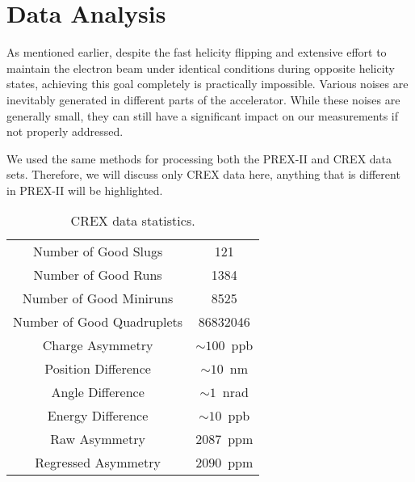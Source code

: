 \chapter{Data Analysis}
\label{cha:data_analysis}
As mentioned earlier, despite the fast helicity flipping and extensive effort to maintain
the electron beam under identical conditions during opposite helicity states, 
achieving this goal completely is practically impossible. Various noises are 
inevitably generated in different parts of the accelerator. While these noises
are generally small, they can still have a significant impact on our measurements
if not properly addressed.

We used the same methods for processing both the PREX-II and CREX data sets. 
Therefore, we will discuss only CREX data here, anything that is different in PREX-II will be
highlighted.

\begin{table}
    \centering
    \begin{tabular}{c | c}
	\hline
	Number of Good Slugs	    & 121   \\
	Number of Good Runs	    & 1384  \\
	Number of Good Miniruns	    & 8525  \\
	Number of Good Quadruplets  & 86832046  \\
	\hline
	Charge Asymmetry    & $\sim 100$~ppb	\\
	Position Difference & $\sim 10$~nm  \\
	Angle Difference    & $\sim 1$~nrad \\
	Energy Difference   & $\sim 10$~ppb \\
	\hline	    
	Raw Asymmetry	    & $2087$~ppm    \\
	Regressed Asymmetry & $2090$~ppm    \\
	\hline
    \end{tabular}
    \caption{CREX data statistics.}
\end{table}


